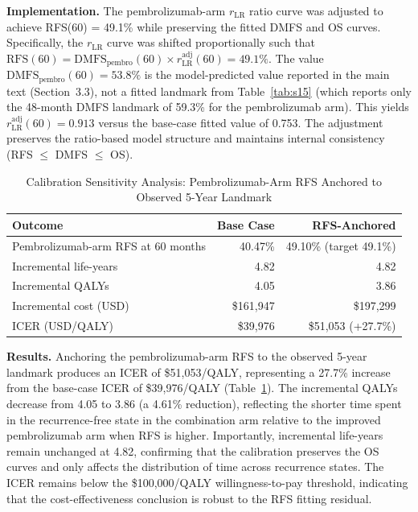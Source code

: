 \documentclass[11pt,a4paper]{article}
\begin{document}
\textbf{Implementation.} The pembrolizumab-arm $r_{\text{LR}}$ ratio curve was adjusted to achieve RFS(60) = 49.1\% while preserving the fitted DMFS and OS curves. Specifically, the $r_{\text{LR}}$ curve was shifted proportionally such that $\text{RFS}(60) = \text{DMFS}_{\text{pembro}}(60) \times r_{\text{LR}}^{\text{adj}}(60) = 49.1\%$. The value $\text{DMFS}_{\text{pembro}}(60) = 53.8\%$ is the model-predicted value reported in the main text (Section~3.3), not a fitted landmark from Table~\ref{tab:s15} (which reports only the 48-month DMFS landmark of 59.3\% for the pembrolizumab arm). This yields $r_{\text{LR}}^{\text{adj}}(60) = 0.913$ versus the base-case fitted value of 0.753. The adjustment preserves the ratio-based model structure and maintains internal consistency (RFS $\leq$ DMFS $\leq$ OS).

\begin{table}[H]
\centering
\caption{Calibration Sensitivity Analysis: Pembrolizumab-Arm RFS Anchored to Observed 5-Year Landmark}
\label{tab:s16}
\begin{tabular*}{\textwidth}{@{\extracolsep{\fill}}lrr}
\toprule
\textbf{Outcome} & \textbf{Base Case} & \textbf{RFS-Anchored} \\
\midrule
Pembrolizumab-arm RFS at 60 months & 40.47\% & 49.10\% (target 49.1\%) \\
Incremental life-years & 4.82 & 4.82 \\
Incremental QALYs & 4.05 & 3.86 \\
Incremental cost (USD) & \$161,947 & \$197,299 \\
ICER (USD/QALY) & \$39,976 & \$51,053 (+27.7\%) \\
\bottomrule
\end{tabular*}
\end{table}

\noindent \textbf{Results.} Anchoring the pembrolizumab-arm RFS to the observed 5-year landmark produces an ICER of \$51,053/QALY, representing a 27.7\% increase from the base-case ICER of \$39,976/QALY (Table~\ref{tab:s16}). The incremental QALYs decrease from 4.05 to 3.86 (a 4.61\% reduction), reflecting the shorter time spent in the recurrence-free state in the combination arm relative to the improved pembrolizumab arm when RFS is higher. Importantly, incremental life-years remain unchanged at 4.82, confirming that the calibration preserves the OS curves and only affects the distribution of time across recurrence states. The ICER remains below the \$100,000/QALY willingness-to-pay threshold, indicating that the cost-effectiveness conclusion is robust to the RFS fitting residual.
\end{document}
